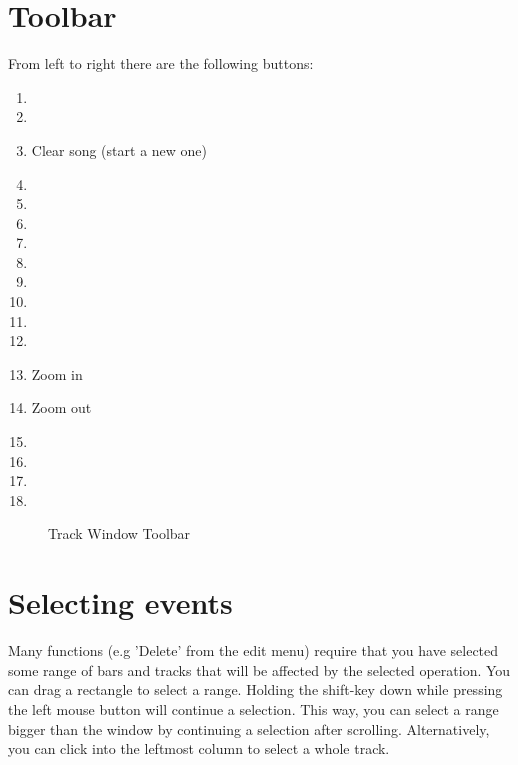 \documentclass[letterpaper]{report}
\begin{document}
\section{Toolbar}\label{twtoolbar}

From left to right there are the following buttons:
\begin{enumerate}
\item {}
\item {}
\item Clear song (start a new one)
\item {}
\item {}
\item {}
\item {}
\item {}
\item {}
\item {}
\item {}
\item {}
\item Zoom in
\item Zoom out
\item {}
\item {}
\item {}
\item {}
\end{enumerate}

\begin{figure}%
%
%
\caption{Track Window Toolbar}%
\end{figure}

\section{Selecting events}\label{select}

Many functions (e.g 'Delete' from the edit menu) require that you have
selected some range of bars and tracks that will be affected by the
selected operation. You can drag a rectangle to select a range. Holding
the shift-key down while pressing the left mouse button will continue a
selection. This way, you can select a range bigger than the window by
continuing a selection after scrolling. Alternatively, you can click
into the leftmost column to select a whole track.
\end{document}
